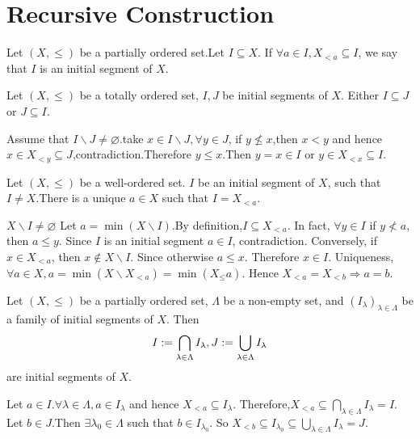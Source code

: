 \documentclass{book}
\numberwithin{equation}{section}
\begin{document}
\section{Recursive Construction}
\begin{definitionenv}
    Let $(X,\le)$ be a partially ordered set.Let $I\subseteq X$. If $\forall a\in I ,X_{<a}\subseteq I$, we say that $I$ is an initial segment of $X$. 
\end{definitionenv}
\begin{propositionenv}
    Let $(X,\le)$ be a totally ordered set, $I,J$ be initial segments of $X$. Either $I\subseteq J$ or $J\subseteq I$.
\end{propositionenv}
\begin{proofenv}
    Assume that $I\backslash J\not=\varnothing$.take $x\in I\backslash J,\forall y\in J$, if $y\not\le x $,then $x<y$ and hence $x\in X_{<y}\subseteq J$,contradiction.Therefore $y\le x$.Then $y=x\in I$ or $y\in X_{<x}\subseteq I$.
\end{proofenv}
\begin{propositionenv}
    Let $(X,\le)$ be a well-ordered set. $I$ be an initial segment of $X$, such that $I\not=X$.There is a unique $a\in X$ such that $I=X_{<a}$.
\end{propositionenv}
\begin{proofenv}
    $X\backslash I\not=\varnothing$ Let $a=\min (X\backslash I)$.By definition,$I\subseteq X_{<a}$. In fact, $\forall y\in I$ if $y\not< a $, then $a\le y$.
    Since $I$ is an initial segment $a\in I$, contradiction.
    \newline
    Conversely, if $x\in X_{<a}$, then $x\notin X\backslash I$. Since otherwise $a\le x$. Therefore $x\in I$. Uniqueness,$\forall a\in X,a=\min(X\backslash X_{<a})=\min(X_\leq a)$. Hence $X_{<a}=X_{<b}\Rightarrow a=b$.
\end{proofenv}
\begin{propositionenv}
    Let $(X,\le)$ be a partially ordered set, $\Lambda$ be a non-empty set, and $(I_\lambda)_{\lambda\in \Lambda}$ be a family of initial segments of $X$. Then 
    $$I:=\bigcap_{\lambda\in \Lambda}I_\lambda,\space J:=\bigcup_{\lambda\in \Lambda}I_\lambda$$ are initial segments of $X$.
\end{propositionenv}
\begin{proofenv}
    \quad
    \newline
    Let $a\in I.\forall \lambda\in \Lambda,a\in I_\lambda$ and hence $X_{<a}\subseteq I_\lambda$. Therefore,$X_{<a}\subseteq\bigcap_{\lambda\in\Lambda}I_\lambda=I$.
    \newline
    Let $b\in J$.Then $\exists \lambda_0\in \Lambda$ such that $b\in I_{\lambda_0}$. So $X_{<b}\subseteq I_{\lambda_0}\subseteq \bigcup_{\lambda\in \Lambda}I_\lambda=J$. 
\end{proofenv}
\end{document}
